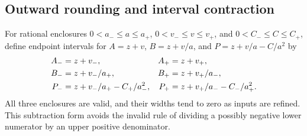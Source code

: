 \documentclass[11pt,letterpaper]{article}
\theoremstyle{remark}\newtheorem{remark}[theorem]{Remark}
\numberwithin{equation}{section}
\begin{document}
\subsection{Outward rounding and interval contraction}
For rational enclosures $0<a_-\le a\le a_+$, $0<v_-\le v\le v_+$, and $0<C_-\le C\le C_+$, define endpoint intervals for
$A=z+v$, $B=z+v/a$, and $P=z+v/a-C/a^2$ by
\begin{align}
 A_-&=z+v_-,&A_+&=z+v_+,\notag\\
 B_-&=z+v_-/a_+,&B_+&=z+v_+/a_-,\label{ppg:all:eq:roundedendpoints}\\
 P_-&=z+v_-/a_+-C_+/a_-^2,
 &P_+&=z+v_+/a_--C_-/a_+^2.\notag
\end{align}
All three enclosures are valid, and their widths tend to zero as inputs are refined. This subtraction form avoids the invalid rule of dividing a possibly negative lower numerator by an upper positive denominator.
\end{document}
